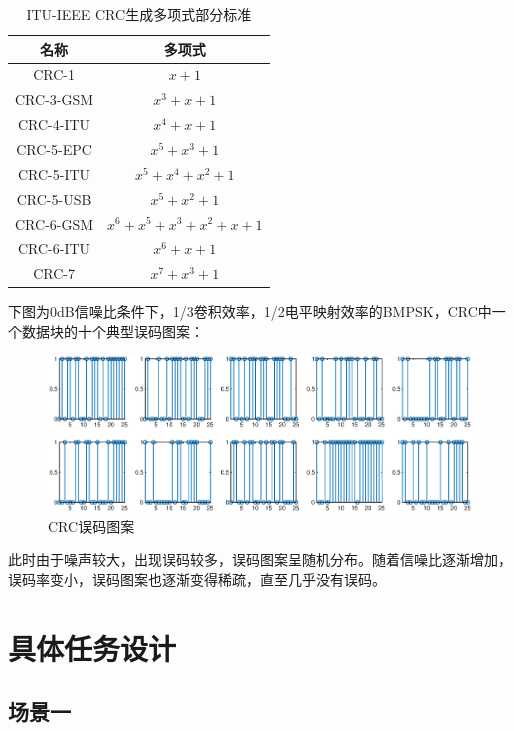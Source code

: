 \begin{table}[h]
    \centering
    \small
    {
        \begin{tabular}{c|c}
            \hline
                名称 & 多项式 \\
            \hline
                CRC-1 & $x+1$ \\
                CRC-3-GSM & $x^3+x+1$ \\
                CRC-4-ITU & $x^4+x+1$ \\
                CRC-5-EPC & $x^5+x^3+1$ \\
                CRC-5-ITU & $x^5+x^4+x^2+1$ \\
                CRC-5-USB & $x^5+x^2+1$ \\
                CRC-6-GSM& $x^6+x^5+x^3+x^2+x+1$ \\
                CRC-6-ITU & $x^6+x+1$ \\
                CRC-7 & $x^7+x^3+1$ \\
            \hline
        \end{tabular}
    }
    \caption{ITU-IEEE CRC生成多项式部分标准}
\end{table}

下图为0dB信噪比条件下，1/3卷积效率，1/2电平映射效率的BMPSK，CRC中一个数据块的十个典型误码图案：

\begin{figure}[h]
    \includegraphics[width=\textwidth]{pic/pattern.eps}
    \caption{CRC误码图案}
\end{figure}

此时由于噪声较大，出现误码较多，误码图案呈随机分布。随着信噪比逐渐增加，误码率变小，误码图案也逐渐变得稀疏，直至几乎没有误码。

\section{具体任务设计}

\subsection{场景一}

